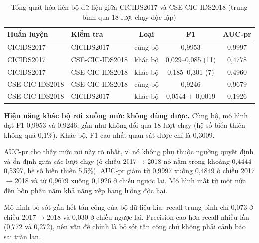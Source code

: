 \begin{table}[htbp]
\centering
\caption[Tổng quát hóa liên bộ dữ liệu CICIDS2017 và CSE-CIC-IDS2018]{Tổng quát hóa liên bộ dữ liệu giữa CICIDS2017 và CSE-CIC-IDS2018 (trung bình qua 18 lượt chạy độc lập)}
\label{tab:cross_dataset}
\begin{tabular*}{\textwidth}{@{\extracolsep{\fill}}llccc@{}}
\toprule
\textbf{Huấn luyện} & \textbf{Kiểm tra} & \textbf{Loại} & \textbf{F1} & \textbf{AUC-\ac{pr}} \\ \midrule
CICIDS2017 & CICIDS2017 & cùng bộ & 0{,}9953 & 0{,}9997 \\
CICIDS2017 & CSE-CIC-IDS2018 & khác bộ & 0{,}029--0{,}085 (11) & 0{,}4778 \\
CICIDS2017 & CSE-CIC-IDS2018 & khác bộ & 0{,}185--0{,}301 (7) & 0{,}4960 \\
CSE-CIC-IDS2018 & CSE-CIC-IDS2018 & cùng bộ & 0{,}9246 & 0{,}9679 \\
CSE-CIC-IDS2018 & CICIDS2017 & khác bộ & 0{,}0544 $\pm$ 0{,}0019 & 0{,}1926 \\ \bottomrule
\end{tabular*}
\end{table}

\textbf{Hiệu năng khác bộ rơi xuống mức không dùng được.} Cùng bộ, mô hình đạt F1 0{,}9953 và 0{,}9246, gần như không đổi qua 18 lượt chạy (hệ số biến thiên không quá 0{,}1\%). Khác bộ, F1 cao nhất quan sát được chỉ là 0{,}3009.

AUC-\ac{pr} cho thấy mức rơi này rõ nhất, vì nó không phụ thuộc ngưỡng quyết định và ổn định giữa các lượt chạy (ở chiều 2017$\rightarrow$2018 nó nằm trong khoảng 0{,}4444--0{,}5397, hệ số biến thiên 5{,}5\%). AUC-\ac{pr} giảm từ 0{,}9997 xuống 0{,}4849 ở chiều 2017$\rightarrow$2018 và từ 0{,}9679 xuống 0{,}1926 ở chiều ngược lại. Mô hình mất từ một nửa đến bốn phần năm khả năng xếp hạng luồng độc hại.

Mô hình bỏ sót gần hết tấn công của bộ dữ liệu kia: recall trung bình chỉ 0{,}073 ở chiều 2017$\rightarrow$2018 và 0{,}030 ở chiều ngược lại. Precision cao hơn recall nhiều lần (0{,}772 và 0{,}272), nên vấn đề chính là bỏ sót tấn công chứ không phải cảnh báo sai tràn lan.

